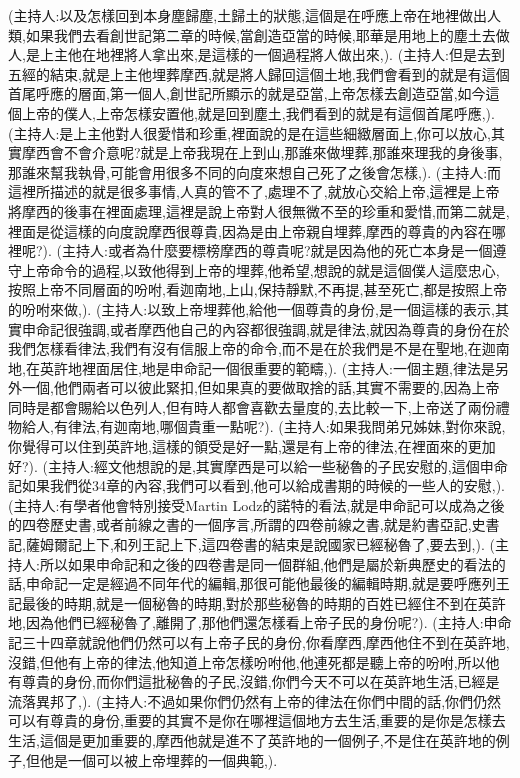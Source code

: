 \documentclass{book}
\begin{document}
(主持人:以及怎樣回到本身塵歸塵,土歸土的狀態,這個是在呼應上帝在地裡做出人類,如果我們去看創世記第二章的時候,當創造亞當的時候,耶華是用地上的塵土去做人,是上主他在地裡將人拿出來,是這樣的一個過程將人做出來,).
(主持人:但是去到五經的結束,就是上主他埋葬摩西,就是將人歸回這個土地,我們會看到的就是有這個首尾呼應的層面,第一個人,創世記所顯示的就是亞當,上帝怎樣去創造亞當,如今這個上帝的僕人,上帝怎樣安置他,就是回到塵土,我們看到的就是有這個首尾呼應,).
(主持人:是上主他對人很愛惜和珍重,裡面說的是在這些細緻層面上,你可以放心,其實摩西會不會介意呢?就是上帝我現在上到山,那誰來做埋葬,那誰來理我的身後事,那誰來幫我執骨,可能會用很多不同的向度來想自己死了之後會怎樣,).
(主持人:而這裡所描述的就是很多事情,人真的管不了,處理不了,就放心交給上帝,這裡是上帝將摩西的後事在裡面處理,這裡是說上帝對人很無微不至的珍重和愛惜,而第二就是,裡面是從這樣的向度說摩西很尊貴,因為是由上帝親自埋葬,摩西的尊貴的內容在哪裡呢?).
(主持人:或者為什麼要標榜摩西的尊貴呢?就是因為他的死亡本身是一個遵守上帝命令的過程,以致他得到上帝的埋葬,他希望,想說的就是這個僕人這麼忠心,按照上帝不同層面的吩咐,看迦南地,上山,保持靜默,不再提,甚至死亡,都是按照上帝的吩咐來做,).
(主持人:以致上帝埋葬他,給他一個尊貴的身份,是一個這樣的表示,其實申命記很強調,或者摩西他自己的內容都很強調,就是律法,就因為尊貴的身份在於我們怎樣看律法,我們有沒有信服上帝的命令,而不是在於我們是不是在聖地,在迦南地,在英許地裡面居住,地是申命記一個很重要的範疇,).
(主持人:一個主題,律法是另外一個,他們兩者可以彼此緊扣,但如果真的要做取捨的話,其實不需要的,因為上帝同時是都會賜給以色列人,但有時人都會喜歡去量度的,去比較一下,上帝送了兩份禮物給人,有律法,有迦南地,哪個貴重一點呢?).
(主持人:如果我問弟兄姊妹,對你來說,你覺得可以住到英許地,這樣的領受是好一點,還是有上帝的律法,在裡面來的更加好?).
(主持人:經文他想說的是,其實摩西是可以給一些秘魯的子民安慰的,這個申命記如果我們從34章的內容,我們可以看到,他可以給成書期的時候的一些人的安慰,).
(主持人:有學者他會特別接受Martin Lodz的諾特的看法,就是申命記可以成為之後的四卷歷史書,或者前線之書的一個序言,所謂的四卷前線之書,就是約書亞記,史書記,薩姆爾記上下,和列王記上下,這四卷書的結束是說國家已經秘魯了,要去到,).
(主持人:所以如果申命記和之後的四卷書是同一個群組,他們是屬於新典歷史的看法的話,申命記一定是經過不同年代的編輯,那很可能他最後的編輯時期,就是要呼應列王記最後的時期,就是一個秘魯的時期,對於那些秘魯的時期的百姓已經住不到在英許地,因為他們已經秘魯了,離開了,那他們還怎樣看上帝子民的身份呢?).
(主持人:申命記三十四章就說他們仍然可以有上帝子民的身份,你看摩西,摩西他住不到在英許地,沒錯,但他有上帝的律法,他知道上帝怎樣吩咐他,他連死都是聽上帝的吩咐,所以他有尊貴的身份,而你們這批秘魯的子民,沒錯,你們今天不可以在英許地生活,已經是流落異邦了,).
(主持人:不過如果你們仍然有上帝的律法在你們中間的話,你們仍然可以有尊貴的身份,重要的其實不是你在哪裡這個地方去生活,重要的是你是怎樣去生活,這個是更加重要的,摩西他就是進不了英許地的一個例子,不是住在英許地的例子,但他是一個可以被上帝埋葬的一個典範,).
\end{document}
